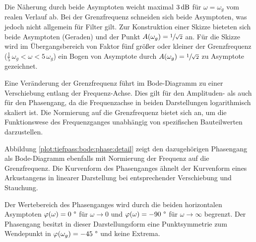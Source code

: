 \begin{frame}
{    Die Näherung durch beide Asymptoten weicht maximal $3 \operatorname{dB}$ für $\omega = \omega_g$ vom realen Verlauf ab.
    Bei der Grenzfrequenz schneiden sich beide Asymptoten, was jedoch nicht allgemein für Filter gilt.
    Zur Konstruktion einer Skizze bieteten sich beide Asymptoten (Geraden) und der Punkt $A(\omega_g) = \sfrac{1}{\sqrt{2}}$ an.
    Für die Skizze wird im Übergangsbereich von Faktor fünf größer oder kleiner der Grenzfrequenz ($\frac{1}{5}\,\omega_g < \omega < 5\,\omega_g$) 
    ein Bogen von Asymptote durch $A(\omega_g)= \sfrac{1}{\sqrt{2}}$ zu Asymptote gezeichnet.
    
    
    Eine Veränderung der Grenzfrequenz führt im Bode-Diagramm zu einer Verschiebung entlang der Frequenz-Achse. 
    Dies gilt für den Amplituden- als auch für den Phasengang, da die Frequenzachse in beiden Darstellungen logarithmisch skaliert ist.
    Die Normierung auf die Grenzfrequenz bietet sich an, um die Funktionswese des Frequenzganges unabhängig von spezifischen Bauteilwerten darzustellen.
    
    Abbildung \ref{plot:tiefpass:bode:phase:detail} zeigt den dazugehörigen Phasengang als Bode-Diagramm ebenfalls mit Normierung der Frequenz auf die Grenzfrequenz.
    Die Kurvenform des Phasenganges ähnelt der Kurvenform eines Arkustangens in linearer Darstellung bei entsprechender Verschiebung und Stauchung.
    

    Der Wertebereich des Phasenganges wird durch die beiden horizontalen Asymptoten 
    $\varphi(\omega) = 0\ \degree$ für $\omega \rightarrow 0$ und 
    $\varphi(\omega) = -90\ \degree$ für $\omega \rightarrow \infty$ begrenzt.
    Der Phasengang besitzt in dieser Darstellungsform eine Punktsymmetrie zum Wendepunkt in $\varphi(\omega_g) = -45\ \degree$ und keine Extrema.

}
\end{frame}
